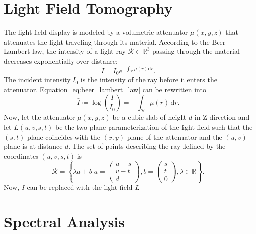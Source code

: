 \section{Light Field Tomography}

The light field display is modeled by a volumetric attenuator $\mu(x, y, z)$ that attenuates the light traveling through its material.
According to the Beer-Lambert law, the intensity of a light ray $\mathcal{R} \subset \mathbb{R}^3$ passing through the material decreases exponentially over distance:
\begin{equation}\label{eq:beer_lambert_law}
	I = I_0 e^{-\int_\mathcal{R} \mu(r) \, \mathrm{d}r }.
\end{equation}
The incident intensity $I_0$ is the intensity of the ray before it enters the attenuator.
Equation~\ref{eq:beer_lambert_law} can be rewritten into 
\begin{equation}
	\bar{I} \coloneqq \log \left( \frac{I}{I_0} \right) = -\int_\mathcal{R} \mu(r) \, \mathrm{d}r.
\end{equation} 
Now, let the attenuator $\mu(x, y, z)$ be a cubic slab of height $d$ in Z-direction and let $L(u, v, s, t)$ be the two-plane parameterization of the light field such that the $(s, t)$-plane coincides with the $(x, y)$-plane of the attenuator and the $(u, v)$-plane is at distance $d$.
The set of points describing the ray defined by the coordinates $(u, v, s, t)$ is
\begin{equation}
	\mathcal{R} = \left\{ \lambda a + b 
	\mathrel{\bigg|} a = 
	\begin{pmatrix}
		u - s \\ 
		v - t \\ 
		d
	\end{pmatrix}, 
	b = 
	\begin{pmatrix}
		s \\ 
		t \\ 
		0
	\end{pmatrix},
	\lambda \in \mathbb{R} 
	\right\}.
\end{equation}
Now, $I$ can be replaced with the light field $L$

\section{Spectral Analysis}
